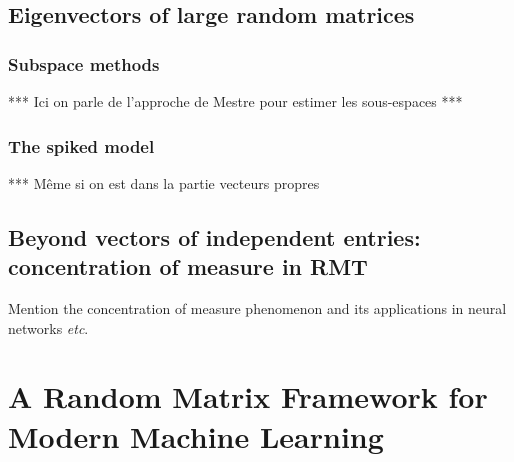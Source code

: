 \documentclass[MAL,biber]{nowfnt} %
\newcommand{\RED}{\color[rgb]{0.70,0,0}}
\newcommand{\etc}{\emph{etc}}
\begin{document}
{\RED 

\section{Eigenvectors of large random matrices}

\subsection{Subspace methods}\label{sec:subspace-method}

*** Ici on parle de l'approche de Mestre pour estimer les sous-espaces ***

\subsection{The spiked model}\label{sec:spiked-model}

*** Même si on est dans la partie vecteurs propres

\section{Beyond vectors of independent entries: concentration of measure in RMT}

}

Mention the concentration of measure phenomenon \citep{ledoux2001concentration} and its applications in neural networks \citep{louart2018random} \etc.

\chapter{A Random Matrix Framework for Modern Machine Learning}
\end{document}
